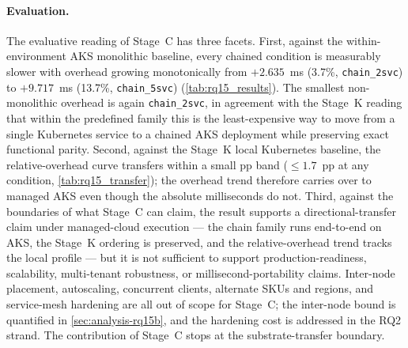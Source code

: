 \paragraph{Evaluation.}
The evaluative reading of Stage~C has three facets. First, against the
within-environment AKS monolithic baseline, every chained condition is
measurably slower with overhead growing monotonically from
$+2.635$~ms (3.7\%, \texttt{chain\_2svc}) to $+9.717$~ms (13.7\%,
\texttt{chain\_5svc}) (\cref{tab:rq15_results}). The smallest
non-monolithic overhead is again \texttt{chain\_2svc}, in agreement with the
Stage~K reading that within the predefined family this is the
least-expensive way to move from a single Kubernetes service to a
chained AKS deployment while preserving exact functional parity. Second,
against the Stage~K local Kubernetes baseline, the relative-overhead curve
transfers within a small pp band ($\leq 1.7$~pp at any condition,
\cref{tab:rq15_transfer}); the overhead trend therefore carries over to
managed AKS even though the absolute milliseconds do not. Third,
against the boundaries of what Stage~C can claim, the result supports a
directional-transfer claim under managed-cloud execution --- the chain
family runs end-to-end on AKS, the Stage~K ordering is preserved, and the
relative-overhead trend tracks the local profile --- but it is not
sufficient to support production-readiness, scalability, multi-tenant
robustness, or millisecond-portability claims. Inter-node placement,
autoscaling, concurrent clients, alternate SKUs and regions, and
service-mesh hardening are all out of scope for Stage~C; the inter-node
bound is quantified in \cref{sec:analysis-rq15b}, and the hardening cost
is addressed in the RQ2 strand. The contribution of Stage~C stops at the
substrate-transfer boundary.

